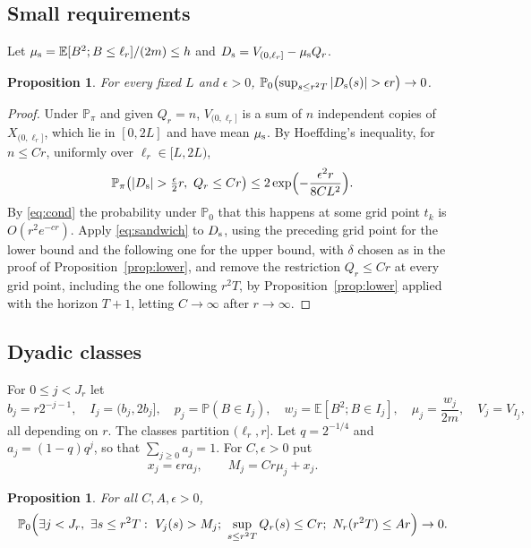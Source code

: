 \documentclass[11pt]{amsart}
\newtheorem{proposition}[theorem]{Proposition}
\theoremstyle{remark}
\numberwithin{equation}{section}
\newcommand{\E}{\mathbb E}
\newcommand{\Pp}{\mathbb P}
\newcommand{\1}{\mathbf 1}
\begin{document}
\subsection{Small requirements}
Let $\mu_{\rm s}=\E[B^2;B\le\ell_r]/(2m)\le h$ and $D_{\rm s}=V_{(0,\ell_r]}-\mu_{\rm s}Q_r$.

\begin{proposition}\label{prop:small}
For every fixed $L$ and $\epsilon>0$, $\Pp_0\bigl(\sup_{s\le r^2T}|D_{\rm s}(s)|>\epsilon r\bigr)\to0$.
\end{proposition}

\begin{proof}
Under $\Pp_\pi$ and given $Q_r=n$, $V_{(0,\ell_r]}$ is a sum of $n$ independent copies of $X_{(0,\ell_r]}$, which lie in $[0,2L]$ and have mean $\mu_{\rm s}$. By Hoeffding's inequality, for $n\le Cr$, uniformly over $\ell_r\in[L,2L)$,
\[
\Pp_\pi\bigl(|D_{\rm s}|>\tfrac\epsilon2r,\ Q_r\le Cr\bigr)\le2\exp\Bigl(-\frac{\epsilon^2r}{8CL^2}\Bigr).
\]
By \eqref{eq:cond} the probability under $\Pp_0$ that this happens at some grid point $t_k$ is $O(r^2e^{-cr})$. Apply \eqref{eq:sandwich} to $D_{\rm s}$, using the preceding grid point for the lower bound and the following one for the upper bound, with $\delta$ chosen as in the proof of Proposition~\ref{prop:lower}, and remove the restriction $Q_r\le Cr$ at every grid point, including the one following $r^2T$, by Proposition~\ref{prop:lower} applied with the horizon $T+1$, letting $C\to\infty$ after $r\to\infty$.
\end{proof}

\subsection{Dyadic classes}
For $0\le j<J_r$ let
\[
b_j=r2^{-j-1},\quad I_j=(b_j,2b_j],\quad p_j=\Pp(B\in I_j),\quad w_j=\E[B^2;B\in I_j],\quad\mu_j=\frac{w_j}{2m},\quad V_j=V_{I_j},
\]
all depending on $r$. The classes partition $(\ell_r,r]$. Let $q=2^{-1/4}$ and $a_j=(1-q)q^j$, so that $\sum_{j\ge0}a_j=1$. For $C,\epsilon>0$ put
\[
x_j=\epsilon ra_j,\qquad M_j=Cr\mu_j+x_j .
\]

\begin{proposition}\label{prop:dyadic}
For all $C,A,\epsilon>0$,
\[
\Pp_0\Bigl(\exists j<J_r,\ \exists s\le r^2T:\ V_j(s)>M_j;\ \sup_{s\le r^2T}Q_r(s)\le Cr;\ N_r(r^2T)\le Ar\Bigr)\to0 .
\]
\end{proposition}
\end{document}
